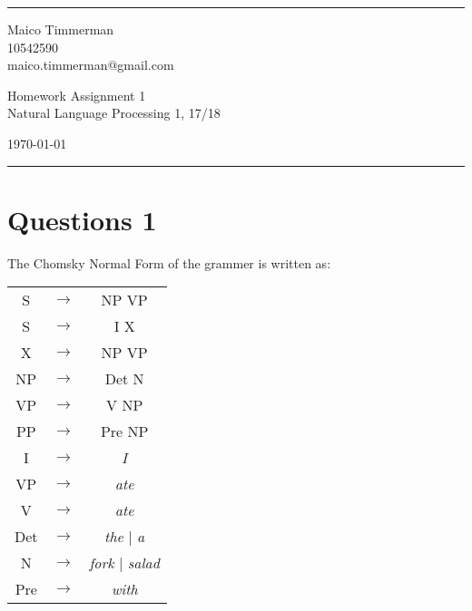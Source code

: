 \documentclass[a4paper]{article}
\begin{document}

\fancyhead[C]{}
\hrule \medskip %
\begin{minipage}{0.295\textwidth}
    \raggedright
    \footnotesize
    Maico Timmerman \hfill\\
    10542590\hfill\\
    maico.timmerman@gmail.com
\end{minipage}
\begin{minipage}{0.4\textwidth}
    \centering
    \large
    Homework Assignment 1\\
    \normalsize
    Natural Language Processing 1, 17/18\\
\end{minipage}
\begin{minipage}{0.295\textwidth}
    \raggedleft
    \today\hfill\\
\end{minipage}
\medskip\hrule
\bigskip


\section*{Questions 1}
The  Chomsky Normal Form of the grammer is written as:

    \begin{table}[h]
        \centering
        \begin{tabular}{ccc}
            S &$\rightarrow$& NP VP\\
            S &$\rightarrow$& I X\\
            X &$\rightarrow$& NP VP\\
            NP &$\rightarrow$& Det N\\
            VP &$\rightarrow$& V NP\\
            PP &$\rightarrow$& Pre NP\\
            I &$\rightarrow$& \textit{I}\\
            VP &$\rightarrow$& \textit{ate}\\
            V &$\rightarrow$& \textit{ate}\\
            Det &$\rightarrow$& \textit{the} | \textit{a}\\
            N &$\rightarrow$& \textit{fork} | \textit{salad}\\
            Pre &$\rightarrow$& \textit{with}
        \end{tabular}
    \end{table}
\end{document}
